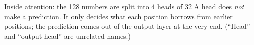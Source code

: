 \documentclass[aspectratio=169,11pt]{beamer}
\begin{document}
\begin{frame}{Inside attention: the 128 numbers are split into 4 heads of 32}
\vspace{1mm}
\small A head does \emph{not} make a prediction. It only decides what each position borrows from earlier positions;
the prediction comes out of the output layer at the very end. (``Head'' and ``output head'' are unrelated names.)
\end{frame}

\end{document}

